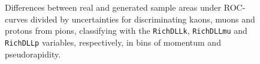 \documentclass[a4paper]{jpconf}
\begin{document}
\begin{figure}
    \centering
    \caption{Differences between real and generated sample areas under ROC-curves divided by uncertainties for discriminating kaons, muons and protons from pions, classifying with the \texttt{RichDLLk}, \texttt{RichDLLmu} and \texttt{RichDLLp} variables, respectively, in bins of momentum and pseudorapidity.}
    \label{fig:DAUCE}
\end{figure}
\end{document}
